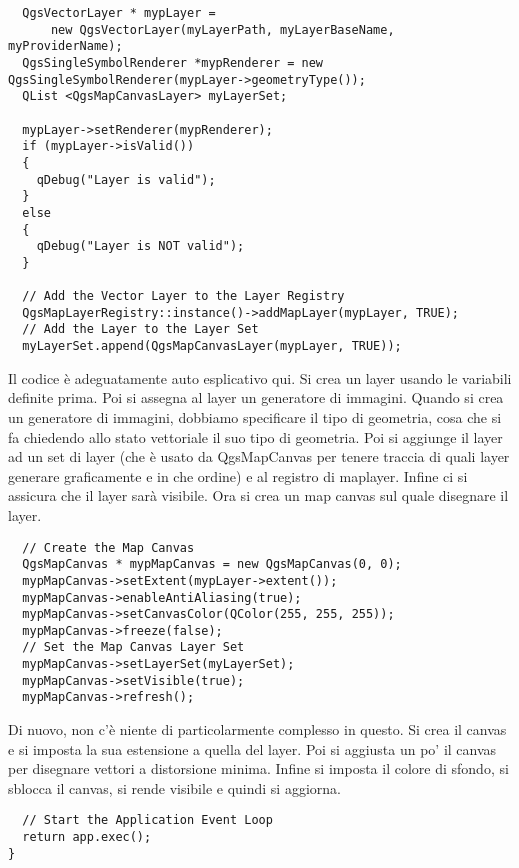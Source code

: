 \begin{verbatim}
  QgsVectorLayer * mypLayer =
      new QgsVectorLayer(myLayerPath, myLayerBaseName, myProviderName);
  QgsSingleSymbolRenderer *mypRenderer = new
QgsSingleSymbolRenderer(mypLayer->geometryType());
  QList <QgsMapCanvasLayer> myLayerSet;

  mypLayer->setRenderer(mypRenderer);
  if (mypLayer->isValid())
  {
    qDebug("Layer is valid");
  }
  else
  {
    qDebug("Layer is NOT valid");
  }

  // Add the Vector Layer to the Layer Registry
  QgsMapLayerRegistry::instance()->addMapLayer(mypLayer, TRUE);
  // Add the Layer to the Layer Set
  myLayerSet.append(QgsMapCanvasLayer(mypLayer, TRUE));

\end{verbatim}

Il codice è adeguatamente auto esplicativo qui. Si crea un layer usando le variabili definite prima. Poi si assegna al layer un generatore di immagini. Quando si crea un generatore di immagini, dobbiamo specificare il tipo di geometria, cosa che si fa chiedendo allo stato vettoriale il suo tipo di geometria. Poi si aggiunge il layer ad un set di layer (che è usato da QgsMapCanvas per tenere traccia di quali layer generare graficamente e in che ordine) e al registro di maplayer. Infine ci si assicura che il layer sarà visibile.
Ora si crea un map canvas sul quale disegnare il layer.

\begin{verbatim}
  // Create the Map Canvas
  QgsMapCanvas * mypMapCanvas = new QgsMapCanvas(0, 0);
  mypMapCanvas->setExtent(mypLayer->extent());
  mypMapCanvas->enableAntiAliasing(true);
  mypMapCanvas->setCanvasColor(QColor(255, 255, 255));
  mypMapCanvas->freeze(false);
  // Set the Map Canvas Layer Set
  mypMapCanvas->setLayerSet(myLayerSet);
  mypMapCanvas->setVisible(true);
  mypMapCanvas->refresh();

\end{verbatim}

Di nuovo, non c'è niente di particolarmente complesso in questo. Si crea il canvas e si imposta la sua estensione a quella del layer. Poi si aggiusta un po' il canvas per disegnare vettori a distorsione minima. Infine si imposta il colore di sfondo, si sblocca il canvas, si rende visibile e quindi si aggiorna.

\begin{verbatim}
  // Start the Application Event Loop
  return app.exec();
}

\end{verbatim}

